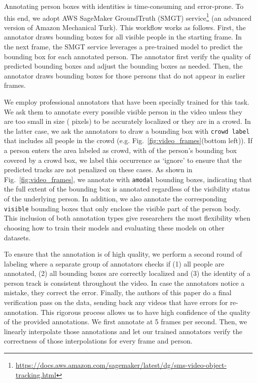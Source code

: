 \documentclass[runningheads]{llncs}
\begin{document}
Annotating person boxes with identities is time-consuming and error-prone. To this end, we adopt AWS SageMaker GroundTruth (SMGT) service\footnote{\scriptsize \url{https://docs.aws.amazon.com/sagemaker/latest/dg/sms-video-object-tracking.html}} (an advanced version of Amazon Mechanical Turk). This workflow works as follows. First, the annotator draws bounding boxes for all visible people in the starting frame. In the next frame, the SMGT service leverages a pre-trained model to predict the bounding box for each annotated person.
The annotator first verify the quality of predicted bounding boxes and adjust the bounding boxes as needed. Then, the annotator draws bounding boxes for those persons that do not appear in earlier frames. 

We employ professional annotators that have been specially trained for this task. 
We ask them to annotate every possible visible person in the video unless they are too small in size ( pixels) to be accurately localized or they are in a crowd. 
In the latter case, we ask the annotators to draw a bounding box with \texttt{crowd label} that includes all people in the crowd (e.g. Fig.~\ref{fig:video_frames}(bottom left)). If a person enters the area labeled as crowd, with   of the person's bounding box covered by a crowd box, we label this occurrence as `ignore' to ensure that the predicted tracks are not penalized on these cases. 
As shown in Fig.~\ref{fig:video_frames}, we annotate with \texttt{amodal} bounding boxes, indicating that the full extent of the bounding box is annotated regardless of the visibility status of the underlying person. In addition, we also annotate the corresponding \texttt{visible} bounding boxes that only enclose the visible part of the person body. This inclusion of both annotation types give researchers the most flexibility when choosing how to train their models and evaluating these models on other datasets.







To ensure that the annotation is of high quality, we perform a second round of labeling where a separate group of annotators checks if (1) all people are annotated, (2) all bounding boxes are correctly localized and (3) the identity of a person track is consistent throughout the video. In case the annotators notice a mistake, they correct the error. 
Finally, the authors of this paper do a final verification pass on the data, sending back any videos that have errors for re-annotation. This rigorous process allows us to have high confidence of the quality of the provided annotations. 
We first annotate at 5 frames per second. Then, we linearly interpolate those annotations and let our trained annotators verify the correctness of those interpolations for every frame and person. 
\end{document}
